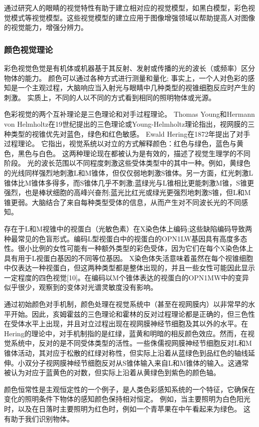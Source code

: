 \documentclass[12pt]{book}
\begin{document}
通过研究人的眼睛的视觉特性有助于建立相对应的视觉模型，如黑白模型，彩色视觉模式等视觉模型。这些视觉模型的建立应用于图像增强领域以帮助提高人对图像的视觉能力，增强分辨力。
				\subsubsection{颜色视觉理论}彩色视觉色觉是有机体或机器基于其反射、发射或传播的光的波长（或频率）区分物体的能力。 颜色可以通过各种方式进行测量和量化; 事实上，一个人对色彩的感知是一个主观过程，大脑响应当入射光与眼睛中几种类型的视锥细胞反应时产生的刺激。 实质上，不同的人以不同的方式看到相同的照明物体或光源。

色彩视觉的两个互补理论是三色理论和对手过程理论。 Thomas Young和Hermann von Helmholtz在19世纪提出的三色理论或Young-Helmholtz理论指出，视网膜的三种类型的视锥优先对蓝色，绿色和红色敏感。 Ewald Hering在1872年提出了对手过程理论。 它指出，视觉系统以对立的方式解释颜色：红色与绿色，蓝色与黄色，黑色与白色。 这两种理论现在都被认为是有效的，描述了视觉生理学的不同阶段。
光的波长范围以不同程度刺激这些受体类型中的其中一种。例如，黄绿色的光线同样强烈地刺激L和M锥体，但仅仅弱地刺激S锥体。另一方面，红光刺激L锥体比M锥体多得多，而S锥体几乎不刺激;蓝绿光与L锥相比更能刺激M锥，S锥更强烈，也是棒状细胞的高峰兴奋剂;蓝光比红光或绿光更强烈地刺激S锥，但L和M锥更弱。大脑结合了来自每种类型受体的信息，从而产生对不同波长光的不同感知。

存在于L和M视锥中的视蛋白（光敏色素）在X染色体上编码;这些缺陷编码导致两种最常见的色盲形式。编码L型视蛋白中的视蛋白的OPN1LW基因具有高度多态性。很小比例的女性可能有一种额外类型的彩色受体，因为它们在每个X染色体上具有用于L视蛋白基因的不同等位基因。 X染色体失活意味着虽然在每个视锥细胞中仅表达一种视蛋白，但这两种类型都是整体出现的，并且一些女性可能因此显示一定程度的四色视觉[10]。在编码以M个锥体表达的视蛋白的OPN1MW中的变异似乎很少，观察到的变体对光谱灵敏度没有影响。

通过初始颜色对手机制，颜色处理在视觉系统中（甚至在视网膜内）以非常早的水平开始。因此，亥姆霍兹的三色理论和霍林的反对过程理论都是正确的，但三色性在受体水平上出现，并且对立过程出现在视网膜神经节细胞及其以外的水平。在Hering的理论中，对手机制指的是红绿，蓝黄和明暗的相反颜色效应。然而，在视觉系统中，反对的是不同受体类型的活性。一些侏儒视网膜神经节细胞反对L和M锥体活动，其对应于松散的红绿对称性，但实际上沿着从蓝绿色到品红色的轴线延伸。小双分子视网膜神经节细胞反对从S锥体输入来自L和M锥体的输入。这通常被认为对应于蓝黄色的对数，但实际上沿着从黄绿色到紫色的颜色轴。

颜色恒常性是主观恒定性的一个例子，是人类色彩感知系统的一个特征，它确保在变化的照明条件下物体的感知颜色保持相对恒定。 例如，当主要照明为白色阳光时，以及在日落时主要照明为红色时，例如一个青苹果在中午看起来为绿色。 这有助于我们识别物体。
\end{document}

